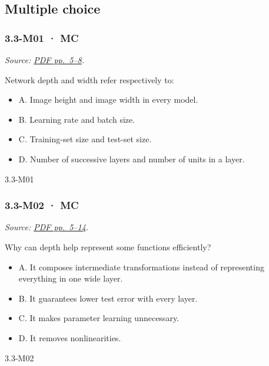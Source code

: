 \subsection{Multiple choice}\label{multiple-choice-9}

\noindent\begin{minipage}{\linewidth}

\subsubsection{3.3-M01 · MC}\label{m01-mc-9}

\emph{Source:
\href{../Lecture\%20Slides/3.3.\%20Deep\%20Learning\%20Fundamentals.pdf\#page=5}{PDF
pp.~5--8}.}

Network depth and width refer respectively to:

\begin{itemize}
\tightlist
\item
  A. Image height and image width in every model.
\item
  B. Learning rate and batch size.
\item
  C. Training-set size and test-set size.
\item
  D. Number of successive layers and number of units in a layer.
\end{itemize}

\begin{solution}[8mm]{3.3-M01}

\end{solution}
\end{minipage}\par\medskip

\noindent\begin{minipage}{\linewidth}

\subsubsection{3.3-M02 · MC}\label{m02-mc-9}

\emph{Source:
\href{../Lecture\%20Slides/3.3.\%20Deep\%20Learning\%20Fundamentals.pdf\#page=5}{PDF
pp.~5--14}.}

Why can depth help represent some functions efficiently?

\begin{itemize}
\tightlist
\item
  A. It composes intermediate transformations instead of representing
  everything in one wide layer.
\item
  B. It guarantees lower test error with every layer.
\item
  C. It makes parameter learning unnecessary.
\item
  D. It removes nonlinearities.
\end{itemize}

\begin{solution}[8mm]{3.3-M02}

\end{solution}
\end{minipage}\par\medskip


